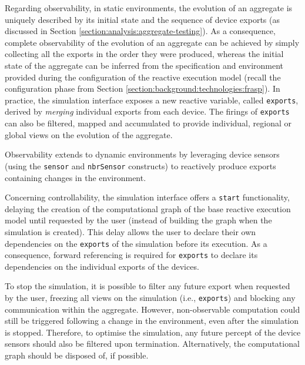 Regarding observability, in static environments, the evolution of an aggregate
is uniquely described by its initial state and the sequence of device exports
(as discussed in Section \ref{section:analysis:aggregate-testing}). As a
consequence, complete observability of the evolution of an aggregate can be
achieved by simply collecting all the exports in the order they were produced,
whereas the initial state of the aggregate can be inferred from the
specification and environment provided during the configuration of the reactive
execution model (recall the configuration phase from Section
\ref{section:background:technologies:frasp}). In practice, the simulation
interface exposes a new reactive variable, called \texttt{exports}, derived by
\textit{merging} individual exports from each device. The firings of
\texttt{exports} can also be filtered, mapped and accumulated to provide
individual, regional or global views on the evolution of the aggregate.

Observability extends to dynamic environments by leveraging device sensors
(using the \texttt{sensor} and \texttt{nbrSensor} constructs) to reactively
produce exports containing changes in the environment.

Concerning controllability, the simulation interface offers a \texttt{start}
functionality, delaying the creation of the computational graph of the base
reactive execution model until requested by the user (instead of building the
graph when the simulation is created). This delay allows the user to declare
their own dependencies on the \texttt{exports} of the simulation before its
execution. As a consequence, forward referencing is required for
\texttt{exports} to declare its dependencies on the individual exports of the
devices.

To stop the simulation, it is possible to filter any future export when
requested by the user, freezing all views on the simulation (i.e.,
\texttt{exports}) and blocking any communication within the aggregate. However,
non-observable computation could still be triggered following a change in the
environment, even after the simulation is stopped. Therefore, to optimise the
simulation, any future percept of the device sensors should also be filtered
upon termination. Alternatively, the computational graph should be disposed of,
if possible.

